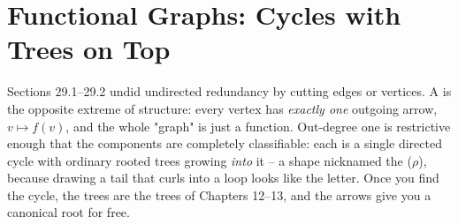\section{Functional Graphs: Cycles with Trees on Top}\label{sec:c31-functional}

\begin{previouslybox}
Sections 29.1--29.2 undid undirected redundancy by cutting edges or vertices.  A
 is the opposite extreme of structure: every vertex has
\emph{exactly one} outgoing arrow, \(v\mapsto f(v)\), and the whole "graph" is just a
function.  Out-degree one is restrictive enough that the components are completely
classifiable: each is a single directed cycle with ordinary rooted trees growing
\emph{into} it -- a shape nicknamed the  (\(\rho\)), because drawing a
tail that curls into a loop looks like the letter.  Once you find the cycle, the
trees are the trees of Chapters 12--13, and the arrows give you a canonical root
for free.
\end{previouslybox}

